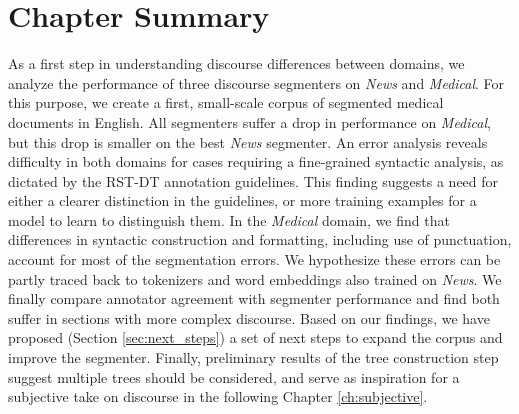 \section{Chapter Summary}
As a first step in understanding discourse differences between domains, we analyze the performance of three discourse segmenters on \textit{News} and \textit{Medical}. For this purpose, we create a first, small-scale corpus of segmented medical documents in English. All segmenters suffer a drop in performance on \textit{Medical}, but this drop is smaller on the best \textit{News} segmenter. An error analysis reveals difficulty in both domains for cases requiring a fine-grained syntactic analysis, as dictated by the RST-DT annotation guidelines. This finding suggests a need for either a clearer distinction in the guidelines, or more training examples for a model to learn to distinguish them. In the \textit{Medical} domain, we find that differences in syntactic construction and formatting, including use of punctuation, account for most of the segmentation errors. We hypothesize these errors can be partly traced back to tokenizers and word embeddings also trained on \textit{News}. We finally compare annotator agreement with segmenter performance and find both suffer in sections with more complex discourse. Based on our findings, we have proposed (Section \ref{sec:next_steps}) a set of next steps to expand the corpus and improve the segmenter. Finally, preliminary results of the tree construction step suggest multiple trees should be considered, and serve as inspiration for a subjective take on discourse in the following Chapter \ref{ch:subjective}.